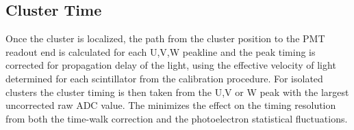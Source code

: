 \subsection {Cluster Time}

Once the cluster is localized, the path from the cluster position to the PMT readout end is calculated for each U,V,W peakline and the peak timing is corrected for propagation delay of the light, using the effective velocity of light determined for each scintillator from the calibration procedure.  For isolated clusters the cluster timing is then taken from the U,V or W peak with the largest uncorrected raw ADC value.  The minimizes the effect on the timing resolution from both the time-walk correction and the photoelectron statistical fluctuations.

